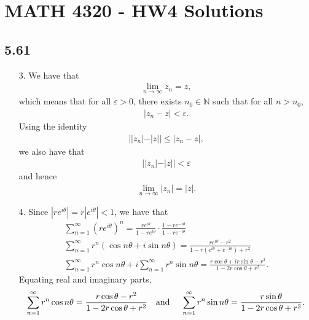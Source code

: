 \documentclass[a4paper,12pt]{article}
\begin{document}
\section*{MATH 4320 - HW4 Solutions}
\subsection*{5.61}
\begin{enumerate}
    \item[3.]
        We have that
        \begin{align*}
            \lim_{n \to \infty} z_n = z,
        \end{align*}
        which means that for all $\varepsilon > 0$, there exists $n_0 \in \mathbb{N}$ such that for all $n > n_0$,
        \begin{align*}
            |z_n - z| < \varepsilon.
        \end{align*}
        Using the identity
        \begin{align*}
            ||z_n| - |z|| \leq |z_n - z|,
        \end{align*}
        we also have that
        \begin{align*}
            ||z_n| - |z|| < \varepsilon
        \end{align*}
        and hence
        \begin{align*}
            \lim_{n \to \infty} |z_n| = |z|.
        \end{align*}

    \item[4.]
        Since $|re^{i\theta}| = r|e^{i\theta}| < 1$, we have that
        \begin{gather*}
            \sum_{n = 1}^\infty (re^{i\theta})^n = \frac{re^{i\theta}}{1 - re^{i\theta}} \cdot \frac{1 - re^{-i\theta}}{1 - re^{-i\theta}} \\
            \sum_{n = 1}^\infty r^n(\cos n\theta + i\sin n\theta) = \frac{re^{i\theta} - r^2}{1 - r(e^{i\theta} + e^{-i\theta}) + r^2} \\
            \sum_{n = 1}^\infty r^n \cos n\theta + i\sum_{n = 1}^\infty r^n \sin n\theta = \frac{r\cos\theta + ir\sin\theta - r^2}{1 - 2r\cos\theta + r^2}.
        \end{gather*}
        Equating real and imaginary parts,
        \begin{gather*}
            \sum_{n = 1}^\infty r^n \cos n\theta = \frac{r\cos\theta - r^2}{1 - 2r\cos\theta + r^2}
            \text{\quad and \quad}
            \sum_{n = 1}^\infty r^n \sin n\theta = \frac{r\sin\theta}{1 - 2r\cos\theta + r^2}.
        \end{gather*}
\end{enumerate}
\end{document}
